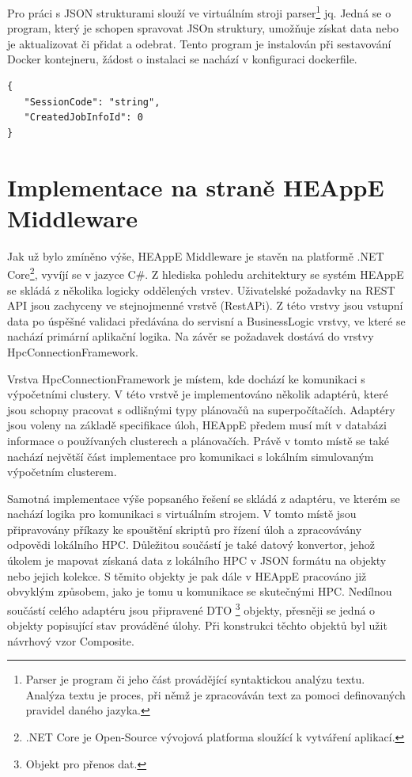 Pro práci s JSON strukturami slouží ve virtuálním stroji parser\footnote{Parser je program či jeho část provádějící syntaktickou analýzu textu. Analýza textu je proces, při němž je zpracováván text za pomoci definovaných pravidel daného jazyka.\cite{uEN4MdNhBpkZmkHF}} jq\cite{qibOqajDMnKYNjXq}. Jedná se o program, který je schopen spravovat JSOn struktury, umožňuje získat data nebo je aktualizovat či přidat a odebrat. Tento program je instalován při sestavování Docker kontejneru, žádost o instalaci se nachází v konfiguraci dockerfile.

\hfill \break
\begin{lstlisting}[caption={Příklad JSON struktury}]
{
   "SessionCode": "string",
   "CreatedJobInfoId": 0
}
\end{lstlisting}

\section{Implementace na straně HEAppE Middleware}
Jak už bylo zmíněno výše, HEAppE Middleware je stavěn na platformě .NET Core\footnote{.NET Core je Open-Source vývojová platforma sloužící k vytváření aplikací.}, vyvíjí se v jazyce C\#. Z hlediska pohledu architektury se systém HEAppE se skládá z několika logicky oddělených vrstev. Uživatelské požadavky na REST API jsou zachyceny ve stejnojmenné vrstvě (RestAPi). Z této vrstvy jsou vstupní data po úspěšné validaci předávána do servisní a BusinessLogic vrstvy, ve které se nachází primární aplikační logika. Na závěr se požadavek dostává do vrstvy HpcConnectionFramework.

Vrstva HpcConnectionFramework je místem, kde dochází ke komunikaci s výpočetními clustery. V této vrstvě je implementováno několik adaptérů, které jsou schopny pracovat s odlišnými typy plánovačů na superpočítačích. Adaptéry jsou voleny na základě specifikace úloh, HEAppE předem musí mít v databázi informace o používaných clusterech a plánovačích. Právě v tomto místě se také nachází největší část implementace pro komunikaci s lokálním simulovaným výpočetním clusterem.

Samotná implementace výše popsaného řešení se skládá z adaptéru, ve kterém se nachází logika pro komunikaci s virtuálním strojem. V tomto místě jsou připravovány příkazy ke spouštění skriptů pro řízení úloh a zpracovávány odpovědi lokálního HPC. Důležitou součástí je také datový konvertor, jehož úkolem je mapovat získaná data z lokálního HPC v JSON formátu na objekty nebo jejich kolekce. S těmito objekty je pak dále v HEAppE pracováno již obvyklým způsobem, jako je tomu u komunikace se skutečnými HPC. Nedílnou součástí celého adaptéru jsou připravené DTO \footnote{Objekt pro přenos dat.} objekty, přesněji se jedná o objekty popisující stav prováděné úlohy. Při konstrukci těchto objektů byl užit návrhový vzor Composite.

